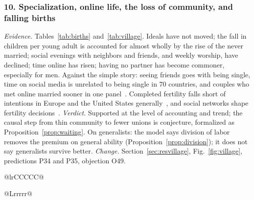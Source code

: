 \subsubsection{10. Specialization, online life, the loss of community, and falling births}
\emph{Evidence.} Tables~\ref{tab:births} and~\ref{tab:village}. Ideals have not moved; the fall in children per young
adult is accounted for almost wholly by the rise of the never married; social evenings with neighbors and friends, and
weekly worship, have declined; time online has risen; having no partner has become commoner, especially for men. Against
the simple story: seeing friends goes with being single, time on social media is unrelated to being single in 70
countries, and couples who met online married sooner in one panel~\cite{rosenfeld2017}. Completed fertility falls short of
intentions in Europe and the United States generally~\cite{beaujouan2019}, and social networks shape fertility
decisions~\cite{bernardi2014}. \emph{Verdict.} Supported at the level of accounting and trend; the causal step from thin
community to fewer unions is conjecture, formalized as Proposition~\ref{prop:waiting}. On generalists: the model says
division of labor removes the premium on general ability (Proposition~\ref{prop:division}); it does not say generalists
survive better. \emph{Change.} Section~\ref{sec:resvillage}, Fig.~\ref{fig:village}, predictions P34 and P35, objection O49.

\begin{table}[t]
\caption{Marriage, children and ideals among adults in the General Social Survey. Children and marital status: ages
25--39. Ideal number of children for a family: ages 18--44, answers of ``as many as you want'' excluded. Weighted.}\label{tab:births}
\scriptsize
\begin{tabularx}{\textwidth}{@{}lrCCCCC@{}}
\toprule
{}
\bottomrule
\end{tabularx}
\end{table}

\begin{table}[t]
\caption{Social ties and partnership among adults aged 22--34, by survey period (General Social Survey; percentages unless
stated; weighted). Questions on partners began in 1988 and on time online in 2000. Surveys from 2021 were partly
self-administered.}\label{tab:village}
\scriptsize
\begin{tabularx}{\textwidth}{@{}Lrrrrr@{}}
\toprule
{}
\bottomrule
\end{tabularx}
\end{table}

